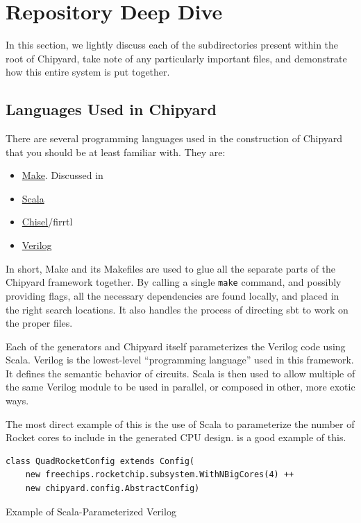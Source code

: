 \chapter{Repository Deep Dive}\label{chap:Repository_Deep_Dive}
In this section, we lightly discuss each of the subdirectories present within the root of Chipyard, take note of any particularly important files, and demonstrate how this entire system is put together.

\section{Languages Used in Chipyard}\label{sec:Langs_used_in_Chipyard}
There are several programming languages used in the construction of Chipyard that you should be at least familiar with.
They are:
\begin{itemize}
\item \href{https://www.gnu.org/software/make/}{Make}.
  Discussed in 
\item \href{https://www.scala-lang.org/}{Scala}
\item \href{https://www.chisel-lang.org/}{Chisel}/\Gls{firrtl}
\item \href{https://en.wikipedia.org/wiki/Verilog}{Verilog}
\end{itemize}

In short, Make and its Makefiles are used to glue all the separate parts of the Chipyard framework together.
By calling a single \texttt{make} command, and possibly providing flags, all the necessary dependencies are found locally, and placed in the right search locations.
It also handles the process of directing \gls{sbt} to work on the proper files.

Each of the generators and Chipyard itself parameterizes the Verilog code using Scala.
Verilog is the lowest-level ``programming language'' used in this framework.
It defines the semantic behavior of circuits.
Scala is then used to allow multiple of the same Verilog module to be used in parallel, or composed in other, more exotic ways.

The most direct example of this is the use of Scala to parameterize the number of Rocket cores to include in the generated CPU design.
 is a good example of this.

\begin{listing}[h!tbp]
\begin{verbatim}
class QuadRocketConfig extends Config(
    new freechips.rocketchip.subsystem.WithNBigCores(4) ++
    new chipyard.config.AbstractConfig)
\end{verbatim}
\caption{Example of Scala-Parameterized Verilog}
\label{lst:Scala_Parameterized_Verilog}
\end{listing}

